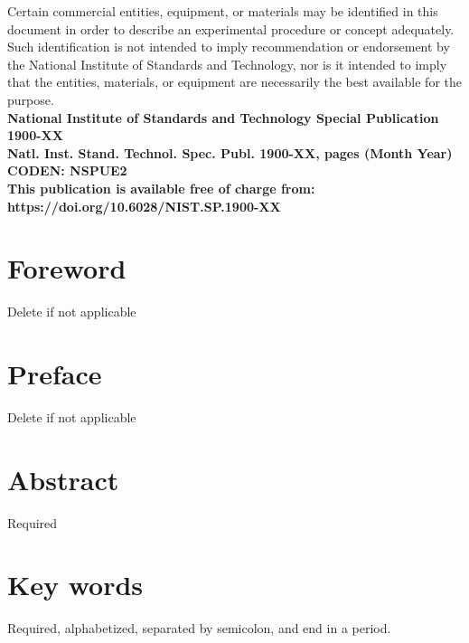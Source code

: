 \documentclass[12pt]{article}
\newcommand{\pubnumber}{1900-XX}
\newcommand{\DOI}{https://doi.org/10.6028/NIST.SP.1900-XX}
\newcommand{\monthyear}{Month Year}
\begin{document}
\begin{titlepage}
\begin{flushright}
\footnotesize  Certain commercial entities, equipment, or materials may be identified in this document in order to describe an experimental procedure or concept adequately. Such identification is not intended to imply recommendation or endorsement by the National Institute of Standards and Technology, nor is it intended to imply that the entities, materials, or equipment are necessarily the best available for the purpose.\\ 
\vfill
\normalsize \textbf{National Institute of Standards and Technology Special Publication \pubnumber\\ 
Natl. Inst. Stand. Technol. Spec. Publ. \pubnumber, \pageref{LastPage} pages (\monthyear)} \\
\textbf{CODEN: NSPUE2}\\
\vspace{12pt}
\textbf{This publication is available free of charge from: \DOI}
\vfill
\end{flushright}
\end{titlepage}
\section*{Foreword}
\normalsize Delete if not applicable\\
\section*{Preface}
\normalsize Delete if not applicable\\
\section*{Abstract}
\normalsize Required\\
\section*{Key words}
\normalsize Required, alphabetized, separated by semicolon, and end in a period.\\
\pagebreak
\begin{center}
	\tableofcontents
	\listoftables
	\listoffigures
\end{center}
\pagebreak
\end{document}
